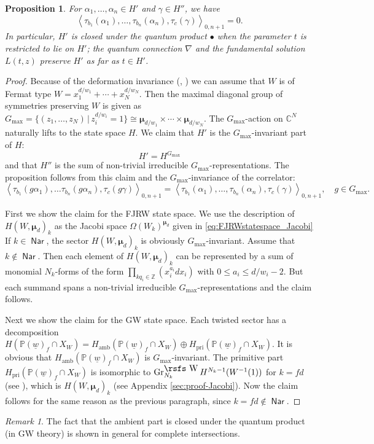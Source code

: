 \documentclass[11pt]{amsart}
\newtheorem{pro}[thm]{Proposition} %
\theoremstyle{definition} %
\theoremstyle{remark} %
\newtheorem{rem}[thm]{Remark}%
\newcommand{\CC}{\mathbb C}
\newcommand{\PP}{\mathbb P}
\newcommand{\ZZ}{\mathbb Z}
\def\corr#1{\left\langle #1 \right\rangle}
\newcommand{\marsfs}[1]{\mbox{\rsfs #1}}
\newcommand{\bmu}{\boldsymbol{\mu}}
\newcommand{\Nar}{\operatorname{\mathsf{Nar}}}
\newcommand{\amb}{\operatorname{amb}}
\newcommand{\pri}{\operatorname{pri}}
\newcommand{\Gr}{\operatorname{Gr}} %
\newcommand{\rsW}{\marsfs{W}}
\newcommand{\uw}{\underline{w}}
\begin{document}
\begin{pro} 
\label{prop:ambient-narrow-closed} 
For $\alpha_1,\dots,\alpha_n\in H'$ and 
$\gamma \in H''$, we have 
\[
\corr{\tau_{b_1}(\alpha_1),\dots,
\tau_{b_n}(\alpha_n), \tau_{c}( \gamma)}_{0,n+1} 
= 0. 
\]
In particular, $H'$ is closed under 
the quantum product $\bullet$ when  
the parameter $t$ is restricted to lie on $H'$;  
the quantum connection $\nabla$ and 
the fundamental solution $L(t,z)$ preserve 
$H'$ as far as $t\in H'$. 
\end{pro} 
\begin{proof} 
Because of the deformation invariance (\cite[Theorem 1.2.5]{FJR:virt}, 
\cite[Theorem 3.4.2]{Chen-Ruan:GW})  
we can assume that $W$ is of Fermat type 
$W = x_1^{d/w_1} + \cdots + x_N^{d/w_N}$. 
Then the maximal diagonal group of symmetries preserving $W$ 
is given as 
$G_{\max} = 
\{(z_1,\dots,z_N)\,|\, z_i^{d/w_i} =1\} 
\cong \bmu_{d/w_1} \times \cdots \times \bmu_{d/w_N}$. 
The $G_{\max}$-action on $\CC^N$ naturally lifts to 
the state space $H$. 
We claim that $H'$ is the $G_{\max}$-invariant 
part of $H$: 
\begin{equation*} 
\label{eq:G_max-fixed}
H' = H^{G_{\max}} 
\end{equation*}
and that $H''$ is the sum of non-trivial 
irreducible $G_{\max}$-representations. 
The proposition follows from this claim and the 
$G_{\max}$-invariance of the correlator: 
\[
\corr{\tau_{b_1} (g\alpha_1), \dots
\tau_{b_n} (g\alpha_n), \tau_{c} (g\gamma)}_{0,n+1} 
= \corr{\tau_{b_1} (\alpha_1),\dots, 
\tau_{b_n} (\alpha_n), \tau_c(\gamma)}_{0,n+1}, 
\quad g\in G_{\max}. 
\]

First we show the claim for the FJRW state space.  
We use the description of $H(W,\bmu_d)_k$ 
as the Jacobi space $\Omega(W_k)^{\bmu_d}$ 
given in \eqref{eq:FJRWstatespace_Jacobi} 
If $k\in \Nar$, the sector $H(W,\bmu_d)_k$ is 
obviously $G_{\max}$-invariant. 
Assume that $k\notin \Nar$. Then 
each element of $H(W,\bmu_d)_k$ can be represented 
by a sum of monomial $N_k$-forms of the form 
$\prod_{k q_i \in \ZZ} (x_i^{a_i} d x_i)$ with 
$0\le a_i \le d/w_i-2$. 
But each summand spans a non-trivial irreducible 
$G_{\max}$-representations and the claim follows. 

Next we show the claim for the GW state space. 
Each twisted sector has a decomposition 
$H(\PP(\uw)_f \cap X_W) = H_{\amb}(\PP(\uw)_f \cap 
X_W) \oplus H_{\pri}(\PP(\uw)_f \cap X_W)$. 
It is obvious that $H_{\amb}(\PP(\uw)_f \cap X_W)$ 
is $G_{\max}$-invariant. The primitive part 
$H_{\pri}(\PP(\uw)_f\cap X_W)$ is isomorphic 
to $\Gr_{N_k}^{\rsW} H^{N_k-1}(W^{-1}(1))$ for $k=fd$ 
(see \cite[p.216]{Steenbrink}), 
which is $H(W,\bmu_d)_k$ (see Appendix \ref{sec:proof-Jacobi}). 
Now the claim follows for the same reason as 
the previous paragraph, since $k=fd \notin \Nar$. 
\end{proof} 
\begin{rem} 
The fact that the ambient part is closed under the 
quantum product (in GW theory) is 
shown \cite[Corollary 2.5]{Iritani:period} 
in general for complete intersections. 
\end{rem}
\end{document}
